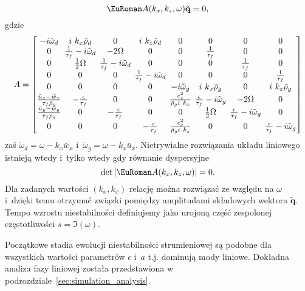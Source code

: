 \begin{equation}
 \eurom{A}(k_x,k_z,\omega)\tilde{\mathbf{q}} = 0,
 \label{eq:linset}
\end{equation}
gdzie 
\begin{equation}
 A =
 \setlength\arraycolsep{2pt}
 \begin{bmatrix}
    -i\tilde{\omega}_d & i~k_x \bar{\rho}_d & 0 & i~k_z \bar{\rho}_d & 0 & 0 & 0 & 0 \\
    0 & \frac{1}{\tau_f} -i \tilde{\omega}_d & -2\Omega & 0 & 0 & \frac{1}{\tau_f} & 0 & 0 \\
    0 & \frac{1}{2}\Omega & \frac{1}{\tau_f} -i \tilde{\omega}_d & 0 & 0 & 0 & \frac{1}{\tau_f} & 0 \\
    0 & 0 & 0 & \frac{1}{\tau_f} -i \tilde{\omega}_d & 0 & 0 & 0 & \frac{1}{\tau_f} \\
    0 & 0 & 0 & 0 & -i\tilde{\omega}_g & i~k_x \bar{\rho}_g & 0 & i~k_z \bar{\rho}_g \\
    \frac{\bar{u}_x - \bar{w}_x}{\tau_f \bar{\rho}_g} & -\frac{\epsilon}{\tau_f} & 0 & 0 &
    \frac{c_s^2}{\bar{\rho}_g i~k_x} & \frac{\epsilon}{\tau_f}-i\tilde{\omega}_g &
    -2\Omega & 0\\
    \frac{\bar{u}_y - \bar{w}_y}{\tau_f \bar{\rho}_g} & 0 & -\frac{\epsilon}{\tau_f} & 0 & 0 &
    \frac{1}{2}\Omega & \frac{\epsilon}{\tau_f} -i \tilde{\omega}_g & 0 \\
    0 & 0 & 0 & -\frac{\epsilon}{\tau_f} & \frac{c_s^2}{\bar{\rho}_g i~k_z} & 0 & 0 &
    \frac{\epsilon}{\tau_f} -i \tilde{\omega}_g
 \end{bmatrix}
%
\end{equation}
zaś $\tilde{\omega}_d = \omega - k_x \bar{w}_x$ i~$\tilde{\omega}_g = \omega -
k_x \bar{u}_x$.
%
Nietrywialne rozwiązania układu liniowego  istnieją wtedy i~tylko
wtedy gdy równanie dyspersyjne 
\begin{equation}
 \det|\eurom{A}(k_x,k_z,\omega)|=0.
 \label{eq:disprel}
\end{equation}
%
Dla zadanych wartości $(k_x, k_x)$ relację  można rozwiązać ze
względu na $\omega$ i~dzięki temu otrzymać związki pomiędzy amplitudami
składowych wektora $\tilde{\mathbf{q}}$.
Tempo wzrostu niestabilności definiujemy jako urojoną część zespolonej
częstotliwości $s=\Im(\omega)$.
%

Początkowe stadia ewolucji niestabilności strumieniowej są podobne dla
wszystkich wartości parametrów $\epsilon$ i~$a$ t.j. dominują mody liniowe.
Dokładna analiza fazy liniowej została przedstawiona w
podrozdziale~\ref{sec:simulation_analysis}.
